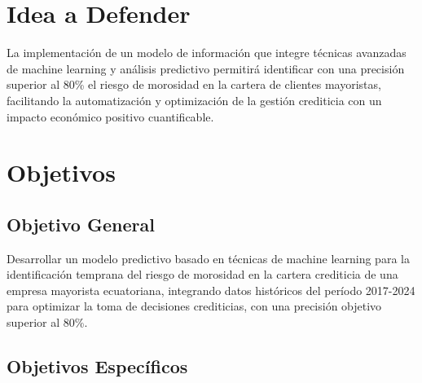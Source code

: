 \section{Idea a Defender}

La implementación de un modelo de información que integre técnicas avanzadas de machine learning y análisis predictivo permitirá identificar con una precisión superior al 80\% el riesgo de morosidad en la cartera de clientes mayoristas, facilitando la automatización y optimización de la gestión crediticia con un impacto económico positivo cuantificable.

\section{Objetivos}

\subsection{Objetivo General}

Desarrollar un modelo predictivo basado en técnicas de machine learning para la identificación temprana del riesgo de morosidad en la cartera crediticia de una empresa mayorista ecuatoriana, integrando datos históricos del período 2017-2024 para optimizar la toma de decisiones crediticias, con una precisión objetivo superior al 80\%.

\subsection{Objetivos Específicos}

